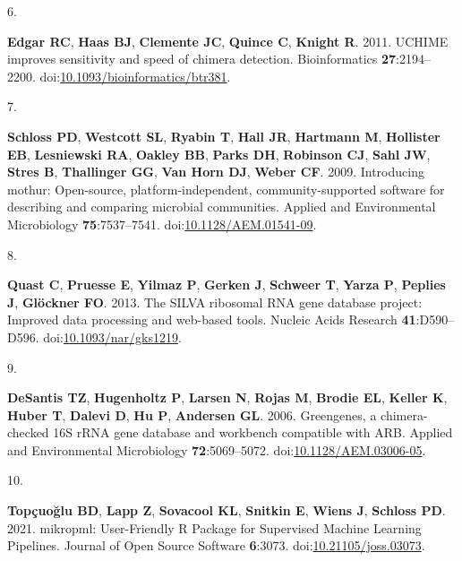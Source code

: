 \documentclass[
]{article}
\newlength{\cslhangindent}
\newlength{\csllabelwidth}
\newlength{\cslentryspacingunit} %
\newenvironment{CSLReferences}[2] %
 {%
  \setlength{\parindent}{0pt}
  \ifodd #1
  \let\oldpar\par
  \def\par{\hangindent=\cslhangindent\oldpar}
  \fi
  \setlength{\parskip}{#2\cslentryspacingunit}
 }%
 {}
\newcommand{\CSLLeftMargin}[1]{\parbox[t]{\csllabelwidth}{#1}}
\newcommand{\CSLRightInline}[1]{\parbox[t]{\linewidth - \csllabelwidth}{#1}\break}
\begin{document}
\begin{CSLReferences}{0}{1}
\leavevmode{}%
\CSLLeftMargin{6. }%
\CSLRightInline{\textbf{Edgar RC}, \textbf{Haas BJ}, \textbf{Clemente
JC}, \textbf{Quince C}, \textbf{Knight R}. 2011. UCHIME improves
sensitivity and speed of chimera detection. Bioinformatics
\textbf{27}:2194--2200.
doi:\href{https://doi.org/10.1093/bioinformatics/btr381}{10.1093/bioinformatics/btr381}.}

\leavevmode{}%
\CSLLeftMargin{7. }%
\CSLRightInline{\textbf{Schloss PD}, \textbf{Westcott SL},
\textbf{Ryabin T}, \textbf{Hall JR}, \textbf{Hartmann M},
\textbf{Hollister EB}, \textbf{Lesniewski RA}, \textbf{Oakley BB},
\textbf{Parks DH}, \textbf{Robinson CJ}, \textbf{Sahl JW}, \textbf{Stres
B}, \textbf{Thallinger GG}, \textbf{Van Horn DJ}, \textbf{Weber CF}.
2009. Introducing mothur: Open-source, platform-independent,
community-supported software for describing and comparing microbial
communities. Applied and Environmental Microbiology
\textbf{75}:7537--7541.
doi:\href{https://doi.org/10.1128/AEM.01541-09}{10.1128/AEM.01541-09}.}

\leavevmode{}%
\CSLLeftMargin{8. }%
\CSLRightInline{\textbf{Quast C}, \textbf{Pruesse E}, \textbf{Yilmaz P},
\textbf{Gerken J}, \textbf{Schweer T}, \textbf{Yarza P}, \textbf{Peplies
J}, \textbf{Glöckner FO}. 2013. The SILVA ribosomal RNA gene database
project: Improved data processing and web-based tools. Nucleic Acids
Research \textbf{41}:D590--D596.
doi:\href{https://doi.org/10.1093/nar/gks1219}{10.1093/nar/gks1219}.}

\leavevmode{}%
\CSLLeftMargin{9. }%
\CSLRightInline{\textbf{DeSantis TZ}, \textbf{Hugenholtz P},
\textbf{Larsen N}, \textbf{Rojas M}, \textbf{Brodie EL}, \textbf{Keller
K}, \textbf{Huber T}, \textbf{Dalevi D}, \textbf{Hu P}, \textbf{Andersen
GL}. 2006. Greengenes, a chimera-checked 16S rRNA gene database and
workbench compatible with ARB. Applied and Environmental Microbiology
\textbf{72}:5069--5072.
doi:\href{https://doi.org/10.1128/AEM.03006-05}{10.1128/AEM.03006-05}.}

\leavevmode{}%
\CSLLeftMargin{10. }%
\CSLRightInline{\textbf{Topçuoğlu BD}, \textbf{Lapp Z}, \textbf{Sovacool
KL}, \textbf{Snitkin E}, \textbf{Wiens J}, \textbf{Schloss PD}. 2021.
mikropml: User-Friendly R Package for Supervised Machine Learning
Pipelines. Journal of Open Source Software \textbf{6}:3073.
doi:\href{https://doi.org/10.21105/joss.03073}{10.21105/joss.03073}.}


\end{CSLReferences}
\end{document}
